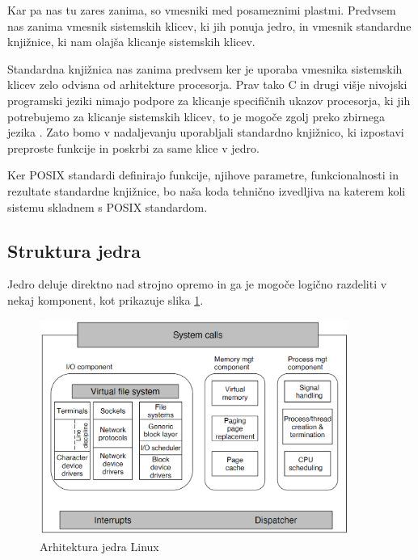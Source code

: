 \documentclass[a4paper,12pt,openright]{book}
\begin{document}
Kar pa nas tu zares zanima, so vmesniki med posameznimi plastmi.
Predvsem nas zanima vmesnik sistemskih klicev, ki jih ponuja jedro, in vmesnik standardne knjižnice, ki nam olajša klicanje sistemskih klicev.

Standardna knjižnica nas zanima predvsem ker je uporaba vmesnika sistemskih klicev zelo odvisna od arhitekture procesorja.
Prav tako C in drugi višje nivojski programski jeziki nimajo podpore za klicanje specifičnih ukazov procesorja, ki jih potrebujemo za klicanje sistemskih klicev, to je mogoče zgolj preko zbirnega jezika \cite{Tanenbaum_Bos_2023}.
Zato bomo v nadaljevanju uporabljali standardno knjižnico, ki izpostavi preproste funkcije in poskrbi za same klice v jedro.

Ker POSIX standardi definirajo funkcije, njihove parametre, funkcionalnosti in rezultate standardne knjižnice, bo naša koda tehnično izvedljiva na katerem koli sistemu skladnem s POSIX standardom.

\subsection{Struktura jedra}

Jedro deluje direktno nad strojno opremo in ga je mogoče logično razdeliti v nekaj komponent, kot prikazuje slika \ref{fig:linux_kernel_architecture}.

\begin{figure}[h!]
	\begin{center}
		\includegraphics[width=0.9\textwidth]{images/linux_kernel_structure.png}
	\end{center}
	\caption{Arhitektura jedra Linux \cite{Tanenbaum_Bos_2023}}
	\label{fig:linux_kernel_architecture}
\end{figure}
\end{document}
